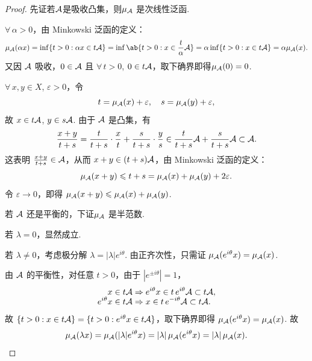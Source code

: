\begin{proof}
    先证若$\mathcal{A}$是吸收凸集，则$\mu_{\mathcal{A}}$ 是次线性泛函.\par
     $\forall\, \alpha > 0$，由 Minkowski 泛函的定义：
    \begin{equation*}
        \mu_\mcal{A}(\alpha x) = \inf\{t > 0 : \alpha x \in t\mcal{A}\} = \inf\ab\{t > 0 : x \in \frac{t}{\alpha}\mcal{A}\}= \alpha \inf\{t > 0 : x \in t\mcal{A}\} = \alpha \mu_\mcal{A}(x).
    \end{equation*}
    又因 $\mathcal{A}$ 吸收，$0 \in \mathcal{A}$ 且 $\forall\, t>0$, $0 \in t\mathcal{A}$，取下确界即得$\mu_{\mathcal{A}}(0) = 0$.

     $\forall\, x, y \in X$, $\varepsilon > 0$，令
    \begin{equation*}
        t = \mu_{\mathcal{A}}(x) + \varepsilon,\quad s = \mu_{\mathcal{A}}(y) + \varepsilon,
    \end{equation*}
    故 $x \in t\mathcal{A}$, $y \in s\mathcal{A}$. 由于 $\mathcal{A}$ 是凸集，有
    \begin{equation*}
        \frac{x+y}{t+s} = \frac{t}{t+s} \cdot \frac{x}{t} + \frac{s}{t+s} \cdot \frac{y}{s} \in \frac{t}{t+s}\mathcal{A} + \frac{s}{t+s}\mathcal{A} \subset \mathcal{A}.
    \end{equation*}
    这表明 $\frac{x+y}{t+s} \in \mathcal{A}$，从而 $x+y \in (t+s)\mathcal{A}$，由 Minkowski 泛函的定义：
    \begin{equation*}
        \mu_{\mathcal{A}}(x+y) \leqslant t+s = \mu_{\mathcal{A}}(x) + \mu_{\mathcal{A}}(y) + 2\varepsilon.
    \end{equation*}
    令 $\varepsilon \to 0$，即得 $\mu_{\mathcal{A}}(x+y) \leqslant \mu_{\mathcal{A}}(x) + \mu_{\mathcal{A}}(y)$.\par
    若 $\mathcal{A}$ 还是平衡的，下证$\mu_{\mathcal{A}}$ 是半范数.\par
     若 $\lambda = 0$，显然成立.\par
    若 $\lambda \neq 0$，考虑极分解 $\lambda = |\lambda| e^{i\theta}$. 由正齐次性，只需证 $\mu_{\mathcal{A}}(e^{i\theta}x) = \mu_{\mathcal{A}}(x)$.\par
    由 $\mathcal{A}$ 的平衡性，对任意 $t > 0$，由于 $|e^{\pm i\theta}| = 1$，
    \begin{align*}
        x \in t\mathcal{A} &\Rightarrow e^{i\theta}x \in t\,e^{i\theta}\mathcal{A} \subset t\mathcal{A} , \\[-5pt]
        e^{i\theta}x \in t\mathcal{A} &\Rightarrow x \in t\,e^{-i\theta}\mathcal{A} \subset t\mathcal{A}.
    \end{align*}
    故 $\{t > 0 : x \in t\mathcal{A}\} = \{t > 0 : e^{i\theta}x \in t\mathcal{A}\}$，取下确界即得 $\mu_{\mathcal{A}}(e^{i\theta}x) = \mu_{\mathcal{A}}(x)$. 故
    \begin{equation*}
        \mu_{\mathcal{A}}(\lambda x) = \mu_{\mathcal{A}}(|\lambda| e^{i\theta}x) = |\lambda|\,\mu_{\mathcal{A}}(e^{i\theta}x) = |\lambda|\,\mu_{\mathcal{A}}(x).\qedhere
    \end{equation*}
\end{proof}

